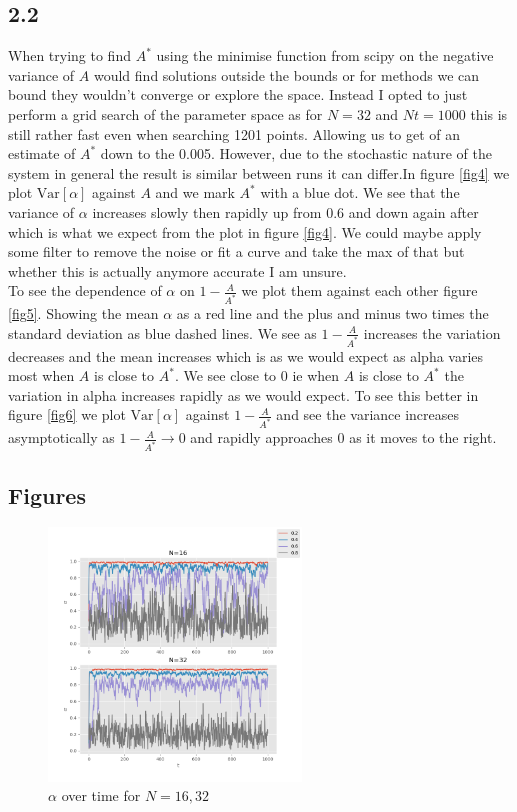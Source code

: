\documentclass{article}
\begin{document}
\subsection{2.2}
When trying to find $A^{*}$ using the minimise function from scipy on the negative variance of $A$ would find solutions outside the bounds or for methods we can bound they wouldn't converge or explore the space. Instead I opted to just perform a grid search of the parameter space as for $N=32$ and $Nt=1000$ this is still rather fast even when searching 1201 points. Allowing us to get of an estimate of $A^{*}$ down to the 0.005. However, due to the stochastic nature of the system in general the result is similar between runs it can differ.In figure \ref{fig4} we plot $\mathrm{Var}[\alpha]$ against $A$ and we mark $A^{*}$ with a blue dot. We see that the variance of $\alpha$ increases slowly then rapidly up from 0.6 and down again after which is what we expect from the plot in figure \ref{fig4}. We could maybe apply some filter to remove the noise or fit a curve and take the max of that but whether this is actually anymore accurate I am unsure.
\\

To see the dependence of $\alpha$ on $1 - \frac{A}{A^{*}}$ we plot them against each other figure \ref{fig5}. Showing the mean $\alpha$ as a red line and the plus and minus two times the standard deviation as blue dashed lines. We see as $1 - \frac{A}{A^{*}}$ increases the variation decreases and the mean increases which is as we would expect as alpha varies most when $A$ is close to $A^{*}$.  We see close to 0 ie when $A$ is close to $A^{*}$ the variation in alpha increases rapidly as we would expect. To see this better in figure \ref{fig6} we plot $\mathrm{Var}[\alpha]$ against  $1 - \frac{A}{A^{*}}$ and see the variance increases asymptotically as $1 - \frac{A}{A^{*}} \xrightarrow{}{} 0$ and rapidly approaches 0 as it moves to the right.

\subsection*{Figures}
\begin{figure}[h!]
\centering

\includegraphics[width=0.6\textwidth]{alphaTime.png}
\caption{$\alpha$ over time for $N=16,32$}
\label{fig1}
\end{figure}
\end{document}
